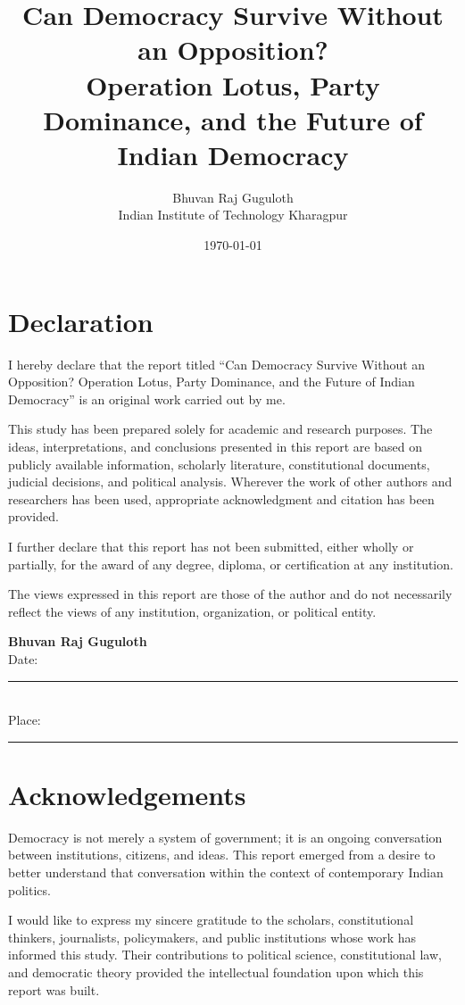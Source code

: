 \documentclass[11pt]{article}
\title{\textbf{Can Democracy Survive Without an Opposition?}\\[0.5em]
\large Operation Lotus, Party Dominance, and the Future of Indian Democracy}
\author{Bhuvan Raj Guguloth\\Indian Institute of Technology Kharagpur}
\date{\today}
\begin{document}
\maketitle
\thispagestyle{empty}
\newpage

\section*{Declaration}
I hereby declare that the report titled ``Can Democracy Survive Without an Opposition? Operation Lotus, Party Dominance, and the Future of Indian Democracy'' is an original work carried out by me.

This study has been prepared solely for academic and research purposes. The ideas, interpretations, and conclusions presented in this report are based on publicly available information, scholarly literature, constitutional documents, judicial decisions, and political analysis. Wherever the work of other authors and researchers has been used, appropriate acknowledgment and citation has been provided.

I further declare that this report has not been submitted, either wholly or partially, for the award of any degree, diploma, or certification at any institution.

The views expressed in this report are those of the author and do not necessarily reflect the views of any institution, organization, or political entity.

\vspace{2em}
\textbf{Bhuvan Raj Guguloth}\\
Date: \rule{4cm}{0.4pt}\\
Place: \rule{4cm}{0.4pt}
\newpage

\section*{Acknowledgements}
Democracy is not merely a system of government; it is an ongoing conversation between institutions, citizens, and ideas. This report emerged from a desire to better understand that conversation within the context of contemporary Indian politics.

I would like to express my sincere gratitude to the scholars, constitutional thinkers, journalists, policymakers, and public institutions whose work has informed this study. Their contributions to political science, constitutional law, and democratic theory provided the intellectual foundation upon which this report was built.
\end{document}
